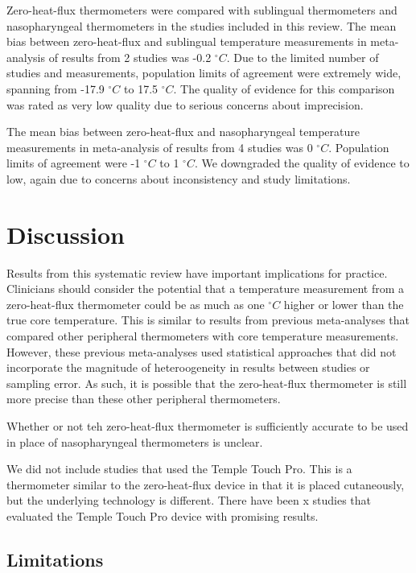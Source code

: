 \documentclass[smallextended]{svjour3}       %
\begin{document}
Zero-heat-flux thermometers were compared with sublingual thermometers
and nasopharyngeal thermometers in the studies included in this review.
The mean bias between zero-heat-flux and sublingual temperature
measurements in meta-analysis of results from 2 studies was -0.2
\(^\circ C\). Due to the limited number of studies and measurements,
population limits of agreement were extremely wide, spanning from -17.9
\(^\circ C\) to 17.5 \(^\circ C\). The quality of evidence for this
comparison was rated as very low quality due to serious concerns about
imprecision.

The mean bias between zero-heat-flux and nasopharyngeal temperature
measurements in meta-analysis of results from 4 studies was 0
\(^\circ C\). Population limits of agreement were -1 \(^\circ C\) to 1
\(^\circ C\). We downgraded the quality of evidence to low, again due to
concerns about inconsistency and study limitations.

\hypertarget{discussion}{%
\section{Discussion}\label{discussion}}

Results from this systematic review have important implications for
practice. Clinicians should consider the potential that a temperature
measurement from a zero-heat-flux thermometer could be as much as one
\(^\circ C\) higher or lower than the true core temperature. This is
similar to results from previous meta-analyses that compared other
peripheral thermometers with core temperature measurements. However,
these previous meta-analyses used statistical approaches that did not
incorporate the magnitude of heteroogeneity in results between studies
or sampling error. As such, it is possible that the zero-heat-flux
thermometer is still more precise than these other peripheral
thermometers.

Whether or not teh zero-heat-flux thermometer is sufficiently accurate
to be used in place of nasopharyngeal thermometers is unclear.

We did not include studies that used the Temple Touch Pro. This is a
thermometer similar to the zero-heat-flux device in that it is placed
cutaneously, but the underlying technology is different. There have been
x studies that evaluated the Temple Touch Pro device with promising
results.

\hypertarget{limitations}{%
\subsection{Limitations}\label{limitations}}
\end{document}
